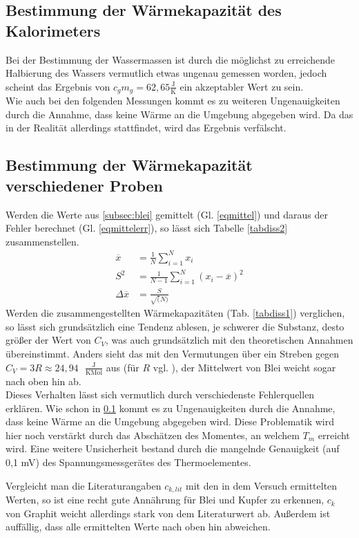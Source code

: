 \subsection{Bestimmung der Wärmekapazität des Kalorimeters}\label{subsec:diss1}
Bei der Bestimmung der Wassermassen ist durch die möglichst zu erreichende Halbierung des Wassers
vermutlich etwas ungenau gemessen worden, jedoch scheint das Ergebnis von 
$c_gm_g=62,65\frac{\text{J}}{\text{K}}$ ein akzeptabler Wert zu sein.\\
Wie auch bei den folgenden Messungen kommt es zu weiteren Ungenauigkeiten durch die Annahme,
dass keine Wärme an die Umgebung abgegeben wird. Da das in der Realität allerdings stattfindet, wird
das Ergebnis verfälscht.
\subsection{Bestimmung der Wärmekapazität verschiedener Proben}
 
Werden die Werte aus \ref{subsec:blei} gemittelt (Gl. \ref{eqmittel}) und daraus der Fehler 
berechnet (Gl. \ref{eqmittelerr}), so lässt sich Tabelle \ref{tabdiss2} zusammenstellen.
\begin{align}
\overline x&=\frac{1}{N} \sum_{i=1}^N x_i \label{eqmittel} \\
S^2&=\frac{1}{N-1} \sum_{i=1}^N (x_i - \overline x)^2 \\
\Delta \overline x&=\frac{S}{\sqrt(N)} \label{eqmittelerr}
\end{align}
Werden die zusammengestellten Wärmekapazitäten (Tab. \ref{tabdiss1}) verglichen, so lässt
sich grundsätzlich eine Tendenz ablesen, je schwerer die Substanz, desto größer der Wert von
$C_V$, was auch grundsätzlich mit den theoretischen Annahmen übereinstimmt. Anders sieht das mit
den Vermutungen über ein Streben gegen $C_V=3R\approx24,94 \text{ }\frac{\text{J}}{\text{K} \text{Mol}}$
aus (für $R$ vgl. \cite{codatar}), der Mittelwert von Blei weicht sogar nach oben hin ab.\\
Dieses Verhalten lässt sich vermutlich durch verschiedenste Fehlerquellen erklären. Wie schon in
\ref{subsec:diss1} kommt es zu Ungenauigkeiten durch die Annahme, dass keine Wärme an die Umgebung 
abgegeben wird. Diese Problematik wird hier noch verstärkt durch das Abschätzen des Momentes, an welchem
$T_m$ erreicht wird. Eine weitere Unsicherheit bestand durch die mangelnde Genauigkeit (auf 0,1 mV) des 
Spannungsmessgerätes des Thermoelementes.  

Vergleicht man die Literaturangaben \cite{tafel} $c_{k,lit}$ mit den in dem Versuch ermittelten Werten,
so ist eine recht gute Annährung für Blei und Kupfer zu erkennen, $c_k$ von Graphit weicht allerdings stark
von dem Literaturwert ab. Außerdem ist auffällig, dass alle ermittelten Werte nach oben hin abweichen.
\FloatBarrier